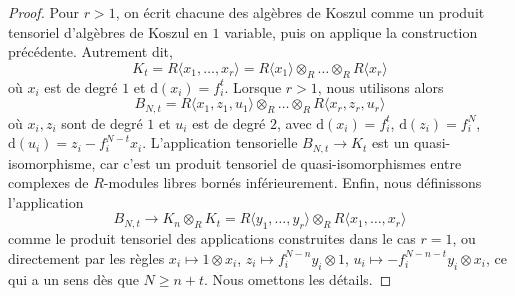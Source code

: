 \begin{proof}
\medskip\noindent
Pour $r > 1$, on écrit chacune des algèbres de Koszul comme un
produit tensoriel d'algèbres de Koszul en $1$ variable, puis on
applique la construction précédente. Autrement dit,
$$
K_t = R\langle x_1, \ldots, x_r\rangle =
R\langle x_1\rangle\otimes_R \ldots\otimes_R R\langle x_r\rangle
$$
où $x_i$ est de degré $1$ et $\text{d}(x_i) = f_i^t$.
Lorsque $r > 1$, nous utilisons alors
$$
B_{N, t} =
R\langle x_1, z_1, u_1 \rangle
\otimes_R \ldots\otimes_R
R\langle x_r, z_r, u_r \rangle
$$
où $x_i, z_i$ sont de degré $1$ et $u_i$ est de degré $2$, avec
$\text{d}(x_i) = f_i^t$, $\text{d}(z_i) = f_i^N$,
$\text{d}(u_i) = z_i - f_i^{N - t}x_i$.
L'application tensorielle $B_{N, t} \to K_t$ est un
quasi-isomorphisme, car c'est un produit tensoriel de quasi-isomorphismes
entre complexes de $R$-modules libres bornés inférieurement. Enfin, nous définissons l'application
$$
B_{N, t}
\to
K_n \otimes_R K_t =
R\langle y_1, \ldots, y_r\rangle\otimes_R
R\langle x_1, \ldots, x_r\rangle
$$
comme le produit tensoriel des applications construites dans le cas $r = 1$,
ou directement par les règles $x_i \mapsto 1 \otimes x_i$,
$z_i \mapsto f_i^{N - n}y_i \otimes 1$,
$u_i \mapsto - f_i^{N - n - t}y_i \otimes x_i$, ce qui a
un sens dès que $N \geq n + t$. Nous omettons les détails.
\end{proof}














